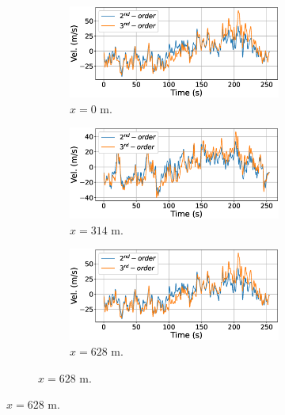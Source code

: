 \documentclass[preprint, review, 12pt]{elsarticle}
\begin{document}
\begin{figure}[!ht]
    \centering
    \begin{subfigure}{0.49\textwidth}
        \begin{subfigure}{\textwidth}
        \includegraphics[width=1.0\linewidth]{plots/samples_0m.eps}
        \caption{$x=0$ m.}
        \end{subfigure}
        \begin{subfigure}{\textwidth}
        \includegraphics[width=1.0\linewidth]{plots/samples_314m.eps}
        \caption{$x=314$ m.}
        \end{subfigure}
        \begin{subfigure}{\textwidth}
        \includegraphics[width=1.0\linewidth]{plots/samples_628m.eps}
        \caption{$x=628$ m.}
        \end{subfigure}
    \end{subfigure}

\end{figure}
\end{document}
